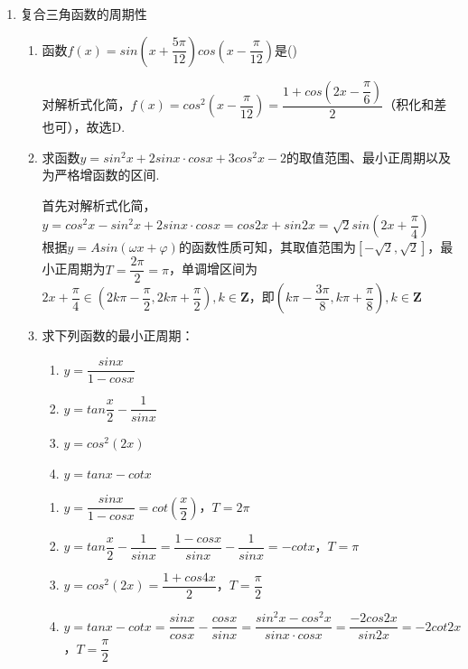 \begin{enumerate}
\item 复合三角函数的周期性
    \begin{enumerate}
        \item 函数$f(x) = sin(x+\dfrac{5\pi}{12})cos(x-\dfrac{\pi}{12})$是\dotfill()
        \begin{jieda}
            对解析式化简，$f(x) = cos^2(x - \dfrac{\pi}{12}) = \dfrac{1+cos(2x - \dfrac{\pi}{6})}{2}$（积化和差也可），故选D.
        \end{jieda}
        \item 求函数$y = sin^2x + 2sinx \cdot cosx + 3cos^2x - 2$的取值范围、最小正周期以及为严格增函数的区间.
        \begin{jieda}
            首先对解析式化简，$y = cos^2x - sin^2x + 2sinx \cdot cosx = cos2x + sin2x = \sqrt{2}sin(2x+\dfrac{\pi}{4})$ \\
            根据$y = Asin(\omega x + \varphi)$的函数性质可知，其取值范围为$[-\sqrt{2}, \sqrt{2}]$，最小正周期为$T = \dfrac{2\pi}{2} = \pi$，单调增区间为$2x+\dfrac{\pi}{4} \in (2k\pi - \dfrac{\pi}{2}, 2k\pi + \dfrac{\pi}{2}), k \in \mathbf{Z}$，即$(k\pi - \dfrac{3\pi}{8}, k\pi + \dfrac{\pi}{8}),  k \in \mathbf{Z}$
        \end{jieda}
        \item 求下列函数的最小正周期：
            \begin{enumerate}
                \item $y = \dfrac{sinx}{1-cosx}$
                \item $y = tan\dfrac{x}{2} - \dfrac{1}{sinx}$
                \item $y = cos^2(2x)$
                \item $y = tanx - cotx$
            \end{enumerate}
            \begin{jieda}
                \begin{enumerate}
                    \item $y = \dfrac{sinx}{1-cosx} = cot(\dfrac{x}{2})$，$T = 2\pi$
                    \item $y = tan\dfrac{x}{2} - \dfrac{1}{sinx} = \dfrac{1-cosx}{sinx} - \dfrac{1}{sinx} = -cotx$，$T = \pi$
                    \item $y = cos^2(2x) = \dfrac{1+cos4x}{2}$，$T = \dfrac{\pi}{2}$
                    \item $y = tanx - cotx = \dfrac{sinx}{cosx} - \dfrac{cosx}{sinx} = \dfrac{sin^2x - cos^2x}{sinx \cdot cosx} = \dfrac{-2cos2x}{sin2x} = -2cot2x$，$T = \dfrac{\pi}{2}$

\end{enumerate}
\end{jieda}
\end{enumerate}
\end{enumerate}
